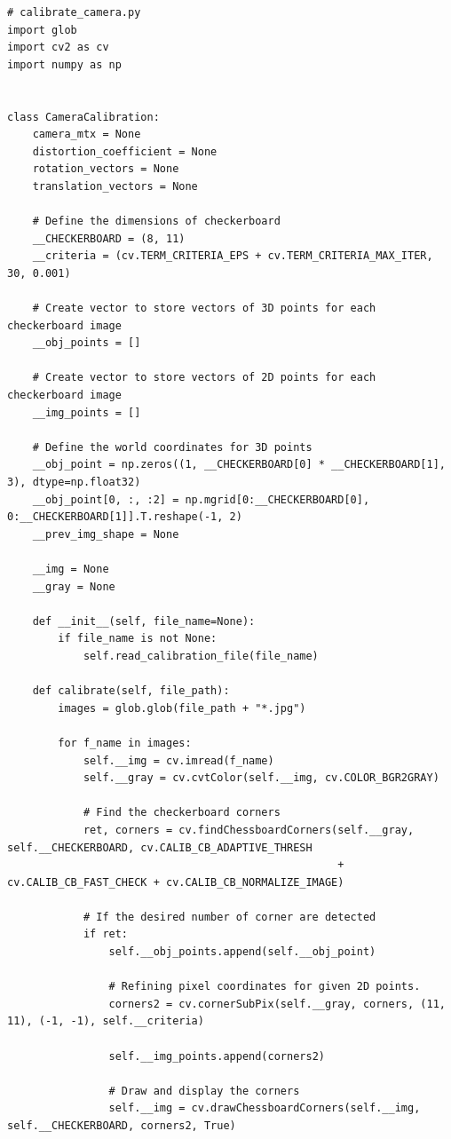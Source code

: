 \documentclass[a4paper, 12pt]{article}
\begin{document}
	\begin{lstlisting}
# calibrate_camera.py	
import glob
import cv2 as cv
import numpy as np


class CameraCalibration:
    camera_mtx = None
    distortion_coefficient = None
    rotation_vectors = None
    translation_vectors = None

    # Define the dimensions of checkerboard
    __CHECKERBOARD = (8, 11)
    __criteria = (cv.TERM_CRITERIA_EPS + cv.TERM_CRITERIA_MAX_ITER, 30, 0.001)

    # Create vector to store vectors of 3D points for each checkerboard image
    __obj_points = []

    # Create vector to store vectors of 2D points for each checkerboard image
    __img_points = []

    # Define the world coordinates for 3D points
    __obj_point = np.zeros((1, __CHECKERBOARD[0] * __CHECKERBOARD[1], 3), dtype=np.float32)
    __obj_point[0, :, :2] = np.mgrid[0:__CHECKERBOARD[0], 0:__CHECKERBOARD[1]].T.reshape(-1, 2)
    __prev_img_shape = None

    __img = None
    __gray = None

    def __init__(self, file_name=None):
        if file_name is not None:
            self.read_calibration_file(file_name)

    def calibrate(self, file_path):
        images = glob.glob(file_path + "*.jpg")

        for f_name in images:
            self.__img = cv.imread(f_name)
            self.__gray = cv.cvtColor(self.__img, cv.COLOR_BGR2GRAY)

            # Find the checkerboard corners
            ret, corners = cv.findChessboardCorners(self.__gray, self.__CHECKERBOARD, cv.CALIB_CB_ADAPTIVE_THRESH
                                                    + cv.CALIB_CB_FAST_CHECK + cv.CALIB_CB_NORMALIZE_IMAGE)

            # If the desired number of corner are detected
            if ret:
                self.__obj_points.append(self.__obj_point)

                # Refining pixel coordinates for given 2D points.
                corners2 = cv.cornerSubPix(self.__gray, corners, (11, 11), (-1, -1), self.__criteria)

                self.__img_points.append(corners2)

                # Draw and display the corners
                self.__img = cv.drawChessboardCorners(self.__img, self.__CHECKERBOARD, corners2, True)


\end{lstlisting}
\end{document}
